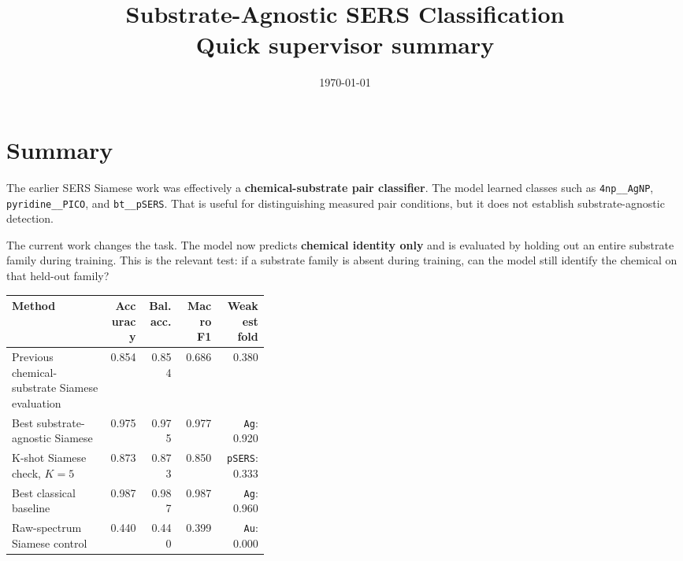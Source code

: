 \documentclass[11pt]{article}
\title{\textbf{Substrate-Agnostic SERS Classification}\\
\large Quick supervisor summary}
\author{}
\date{\today}
\begin{document}
\maketitle

\section*{Summary}

The earlier SERS Siamese work was effectively a \textbf{chemical-substrate pair classifier}. The model learned classes such as \texttt{4np\_\_AgNP}, \texttt{pyridine\_\_PICO}, and \texttt{bt\_\_pSERS}. That is useful for distinguishing measured pair conditions, but it does not establish substrate-agnostic detection.

The current work changes the task. The model now predicts \textbf{chemical identity only} and is evaluated by holding out an entire substrate family during training. This is the relevant test: if a substrate family is absent during training, can the model still identify the chemical on that held-out family?

\begin{center}
\begin{tabular}{p{0.38\linewidth}rrrr}
\toprule
\textbf{Method} & \textbf{Accuracy} & \textbf{Bal. acc.} & \textbf{Macro F1} & \textbf{Weakest fold} \\
\midrule
Previous chemical-substrate Siamese evaluation & 0.854 & 0.854 & 0.686 & 0.380 \\
Best substrate-agnostic Siamese & 0.975 & 0.975 & 0.977 & \texttt{Ag}: 0.920 \\
K-shot Siamese check, $K=5$ & 0.873 & 0.873 & 0.850 & \texttt{pSERS}: 0.333 \\
Best classical baseline & 0.987 & 0.987 & 0.987 & \texttt{Ag}: 0.960 \\
Raw-spectrum Siamese control & 0.440 & 0.440 & 0.399 & \texttt{Au}: 0.000 \\
\bottomrule
\end{tabular}
\end{center}
\end{document}
